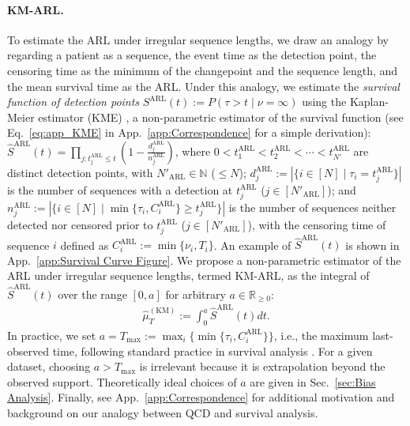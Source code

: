 \documentclass{article}
\theoremstyle{plain}
\theoremstyle{definition}
\theoremstyle{remark}
\def\mbr{\mathbb{R}}
\def\mbn{\mathbb{N}}
\begin{document}
\paragraph{KM-ARL.}
To estimate the ARL under irregular sequence lengths, we draw an analogy by regarding a patient as a sequence, the event time as the detection point, the censoring time as the minimum of the changepoint and the sequence length, and the mean survival time as the ARL.
Under this analogy, we estimate the \textit{survival function of detection points} $S^\mathrm{ARL}(t):= P(\tau > t \mid \nu=\infty)$ using the Kaplan-Meier estimator (KME) \citep{kaplan1958nonparametric_KME_org}, a non-parametric estimator of the survival function (see Eq.~\eqref{eq:app_KME} in App.~\ref{app:Correspondence} for a simple derivation): 
$\hat{S}^\mathrm{ARL}(t) = \prod_{j: t_j^\mathrm{ARL} \leq t} (1 - \frac{d_j^\mathrm{ARL}}{n_j^\mathrm{ARL}})$, 
where 
$0 < t_1^\mathrm{ARL} < t_2^\mathrm{ARL} < \cdots < t_{N'}^\mathrm{ARL}$ are distinct detection points, with $N'_\mathrm{ARL} \in \mbn$ ($\leq N$);
$d_j^\mathrm{ARL} := | \{ i \in [N] \mid \tau_i = t_j^\mathrm{ARL} \} |$ is the number of sequences with a detection at $t_j^\mathrm{ARL}$ ($j \in [N'_\mathrm{ARL}]$);
and 
$n_j^\mathrm{ARL} := |\{i \in [N] \mid \min \{ \tau_i, C_i^\mathrm{ARL} \} \geq t_j^\mathrm{ARL} \}|$ is the number of sequences neither detected nor censored prior to $t_j^\mathrm{ARL}$ ($j \in [N'_\mathrm{ARL}]$),
with the censoring time of sequence $i$ defined as $C_i^\mathrm{ARL} := \min \{ \nu_i, T_i \}$.
An example of $\hat{S}^\mathrm{ARL}(t)$ is shown in App.~\ref{app:Survival Curve Figure}.
We propose a non-parametric estimator of the ARL under irregular sequence lengths, termed KM-ARL, as the integral of $\hat{S}^\mathrm{ARL}(t)$ over the range $[0, a]$ for arbitrary $a \in \mbr_{\geq 0}$: 
\begin{align}
    \hat{\mu}_T^\mathrm{(KM)} := \int_0^{a} \hat{S}^\mathrm{ARL}(t) dt.
    \label{eq:def_KM_ARL}
\end{align}
In practice, we set $a = T_\mathrm{max} := \max_i\{\min\{\tau_i, C_i^\mathrm{ARL}\}\}$, i.e., the maximum last-observed time, following standard practice in survival analysis \citep{tony2018calculating, calkins2018application}.
For a given dataset, choosing $a > T_\mathrm{max}$ is irrelevant because it is extrapolation beyond the observed support.
Theoretically ideal choices of $a$ are given in Sec.~\ref{sec:Bias Analysis}.
Finally, see App.~\ref{app:Correspondence} for additional motivation and background on our analogy between QCD and survival analysis.
\end{document}

